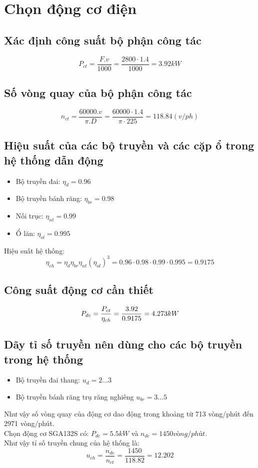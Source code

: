\section{Chọn động cơ điện}
\subsection{Xác định công suất bộ phận công tác}
\[
    P_{ct} = \frac{F.v}{1000} = \frac{2800 \cdot 1.4}{1000} = 3.92 kW
\]
\subsection{Số vòng quay của bộ phận công tác}
\begin{center}
\[
    n_{ct} = \frac{60000.v}{\pi.D} = \frac{60000\cdot1.4}{\pi\cdot225} = 118.84 (v/ph)
\]
\end{center}
\subsection{Hiệu suất của các bộ truyền và các cặp ổ trong hệ thống dẫn động}
\begin{itemize}
    \item Bộ truyền đai: $\eta_{d} = 0.96$ 
    \item Bộ truyền bánh răng: $\eta_{br} = 0.98$
    \item Nối trục: $\eta_{nt} = 0.99$
    \item Ổ lăn: $\eta_{ol} = 0.995$
\end{itemize}
Hiệu suất hệ thống:
\[
    \eta _{ch} = \eta_{d}\eta_{br}\eta_{nt}(\eta_{ol})^3 = 0.96 \cdot 0.98 \cdot 0.99 \cdot 0.995 = 0.9175
\]
\subsection{Công suất động cơ cần thiết}
\[
    P_{dc} = \frac{P_{ct}}{\eta_{ch}} = \frac{3.92}{0.9175} = 4.273 kW\\
\]    
\subsection{Dãy tỉ số truyền nên dùng cho các bộ truyền trong hệ thống}

\begin{itemize}
    \item Bộ truyền đai thang: $u_{d} = 2...3$
    \item Bộ truyền bánh răng trụ răng nghiêng $u_{br} = 3...5$
\end{itemize}
Như vậy số vòng quay của động cơ dao động trong khoảng từ 713 vòng/phút đến 2971 vòng/phút.\\
Chọn động cơ SGA132S có: $P_{dc} = 5.5 kW$ và $n_{dc} = 1450 vòng/phút$. \\
Như vậy tỉ số truyền chung của hệ thống là:
\[
    u_{ch} =\frac{n_{dc}}{n_{ct}} = \frac{1450}{118.82} = 12.202
\]

